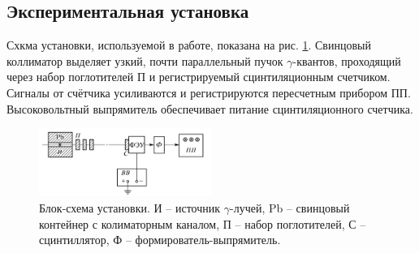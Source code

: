 \subsection*{Экспериментальная установка}

Схкма установки, используемой в работе, показана на рис. \ref{fig:exp1}. Свинцовый коллиматор выделяет узкий, почти параллельный пучок $\gamma$-квантов, проходящий через набор поглотителей П и регистрируемый сцинтиляционным счетчиком. Сигналы от счётчика усиливаются и регистрируются пересчетным прибором ПП. Высоковольтный выпрямитель обеспечивает питание сцинтиляционного счетчика.

\begin{figure}[h]
    \centering
    \includegraphics[width=0.5\textwidth]{figures/exp_1.png}
    \caption{Блок-схема установки. И -- источник $\gamma$-лучей, Pb -- свинцовый контейнер с колиматорным каналом, П -- набор поглотителей, С -- сцинтиллятор, Ф -- формирователь-выпрямитель.}
    \label{fig:exp1}
\end{figure}

